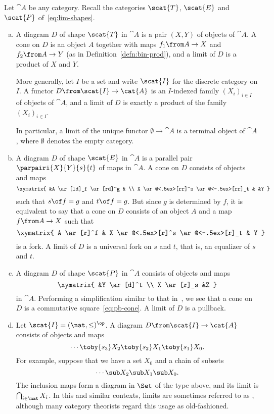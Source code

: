 \begin{examples}        
\label{egs:lims}
Let $\cat{A}$ be any category.  Recall the categories $\scat{T}$,
$\scat{E}$ and $\scat{P}$ of~\eqref{eq:lim-shapes}.
% 
\begin{enumerate}[(b)]
\item
A diagram $D$ of shape $\scat{T}$ in $\cat{A}$ is a pair $(X, Y)$ of
objects of $\cat{A}$.  A cone on $D$ is an object $A$ together with maps
$f_1\from A \to X$ and $f_2\from A \to Y$ (as in
Definition~\ref{defn:bin-prod}), and a limit of $D$ is a product of $X$ and
$Y$.

More generally, let $I$ be a set and write $\scat{I}$ for the discrete
category on $I$.  A functor $D\from \scat{I} \to \cat{A}$ is an $I$-indexed
family $(X_i)_{i \in I}$ of objects of $\cat{A}$, and a limit of $D$ is
exactly a product of the family $(X_i)_{i \in I}$.

In particular, a limit of the unique functor $\emptyset \to \cat{A}$ is a
terminal object of $\cat{A}$, where $\emptyset$ denotes the empty category.

\item	
\label{eg:lim-eq}
A diagram $D$ of shape $\scat{E}$ in $\cat{A}$ is a parallel pair
$\parpairi{X}{Y}{s}{t}$ of maps in $\cat{A}$.  A cone on $D$ consists of
objects and maps
\[
\xymatrix{
        &A \ar[ld]_f \ar[rd]^g  &       \\
X \ar@<.5ex>[rr]^s \ar@<-.5ex>[rr]_t    &       &Y      
}
\]
such that $s \of f = g$ and $t \of f = g$.  But since $g$ is determined by
$f$, it is equivalent to say that a cone on $D$ consists of an object $A$ and
a map $f\from A \to X$ such that 
\[
\xymatrix{
A \ar[r]^f   &
X \ar@<.5ex>[r]^s \ar@<-.5ex>[r]_t    &
Y
}
\]
is a fork.  A limit of $D$ is a universal fork on $s$ and $t$, that is, an
equalizer of $s$ and $t$.

\item
A diagram $D$ of shape $\scat{P}$ in $\cat{A}$ consists of objects and maps
\[
\xymatrix{      
                &Y \ar[d]^t     \\
X \ar[r]_s      &Z
}
\]
in $\cat{A}$.  Performing a simplification similar to that
in~, we see that a cone on $D$ is a commutative
square~\eqref{eq:pb-cone}.  A limit of $D$ is a pullback.

\item   
\label{eg:lim-seq}
Let $\scat{I} = (\nat, \mathord{\leq})^\op$.  A diagram $D\from \scat{I}
\to \cat{A}$ consists of objects and maps
\[
\cdots \toby{s_3} X_2 \toby{s_2} X_1 \toby{s_1} X_0.
\]
For example, suppose that we have a set $X_0$ and a chain of
subsets
\[
\cdots \sub X_2 \sub X_1 \sub X_0.
\]
The inclusion maps form a diagram in $\Set$ of the type above, and its limit
is $\bigcap_{i \in \nat} X_i$.%
%
%
In this and similar contexts, limits are sometimes referred to as
, although many category theorists regard this usage as
old-fashioned.
\end{enumerate}
\end{examples}

